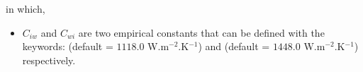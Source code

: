 in which,
\begin{itemize}
	\item $C_{iw}$ and $C_{wi}$ are two empirical constants that can be defined with the keywords:
  (default = $1118.0$ W.m$^{-2}$.K$^{-1}$)
and  (default = $1448.0$ W.m$^{-2}$.K$^{-1}$) respectively.

\end{itemize}

\clearpage
